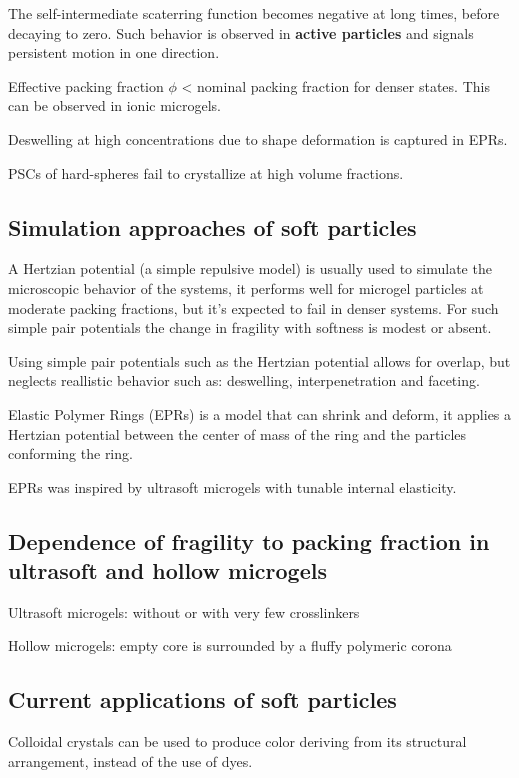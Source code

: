 \documentclass[11pt]{article}
\begin{document}
The self-intermediate scaterring function becomes negative at long times, before decaying to zero.\autocite{Gnan.2019} Such behavior is observed in \textbf{active particles} and signals persistent motion in one direction.

Effective packing fraction $\phi$ < nominal packing fraction for denser states.\autocite{Gnan.2019} This can be observed in ionic microgels.

Deswelling at high concentrations due to shape deformation is captured in EPRs.\autocite{Gnan.2019}

PSCs of hard-spheres fail to crystallize at high volume fractions.\autocite{Marson.2019}

\subsection{Simulation approaches of soft particles}
A Hertzian potential (a simple repulsive model) is usually used to simulate the microscopic behavior of the systems, it performs well for microgel particles at moderate packing fractions, but it's expected to fail in denser systems.\autocite{Gnan.2019} For such simple pair potentials the change in fragility with softness is modest\autocite{Sengupta.2011} or absent\autocite{Michele.2004}. 

Using simple pair potentials such as the Hertzian potential allows for overlap, but neglects reallistic behavior such as: deswelling, interpenetration and faceting.

Elastic Polymer Rings (EPRs) is a model that can shrink and deform, it applies a Hertzian potential between the center of mass of the ring and the particles conforming the ring.\autocite{Gnan.2019}

EPRs was inspired by ultrasoft microgels with tunable internal elasticity.\autocite{Bachman.2015}

\subsection{Dependence of fragility to packing fraction in ultrasoft and hollow microgels}
Ultrasoft microgels: without or with very few crosslinkers\autocite{Gnan.2019}

Hollow microgels: empty core is surrounded by a fluffy polymeric corona\autocite{Gnan.2019}


\subsection{Current applications of soft particles}
Colloidal crystals can be used to produce color deriving from its structural arrangement, instead of the use of dyes.\autocite{Shah.2014}
\end{document}
